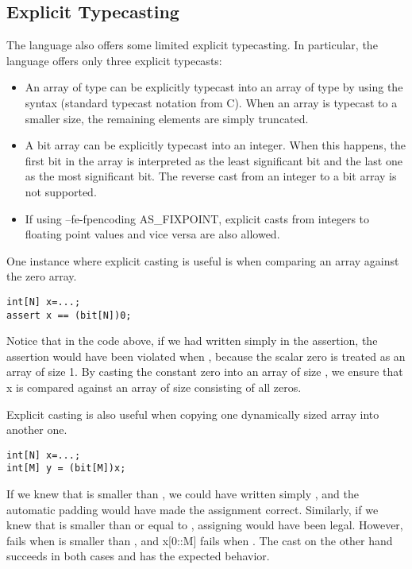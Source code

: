 \subsection{Explicit Typecasting}
The \Sk{} language also offers some limited explicit typecasting. In particular, the language offers only three explicit typecasts:
\begin{itemize}

\item An array  of type  can be explicitly typecast into an array of type  by using the syntax  (standard typecast notation from C). When an array is typecast to a smaller size, the remaining elements are simply truncated. 

\item A bit array  can be explicitly typecast into an integer. When this happens, the first bit in the array is interpreted as the least significant bit and the last one as the most significant bit. The reverse cast from an integer to a bit array is not supported.

\item If using --fe-fpencoding AS_FIXPOINT, explicit casts from integers to floating point values and vice versa are also allowed.

\end{itemize}

\begin{Example}
One instance where explicit casting is useful is when comparing an array against the zero array.
\begin{lstlisting}
int[N] x=...;
assert x == (bit[N])0;
\end{lstlisting}
Notice that in the code above, if we had written simply  in the assertion, the assertion would have been violated when , because the scalar zero is treated as an array of size 1. By casting the constant zero into an array of size , we ensure that x is compared against an array of size  consisting of all zeros.
\end{Example}

\begin{Example}
Explicit casting is also useful when copying one dynamically sized array into another one.
\begin{lstlisting}
int[N] x=...;
int[M] y = (bit[M])x;
\end{lstlisting}
If we knew that  is smaller than , we could have written simply , and the automatic padding would have made the assignment correct. Similarly, if we knew that  is smaller than or equal to , assigning  would have been legal. However,  fails when  is smaller than , and x[0::M] fails when . The cast on the other hand succeeds in both cases and has the expected behavior.
\end{Example}

